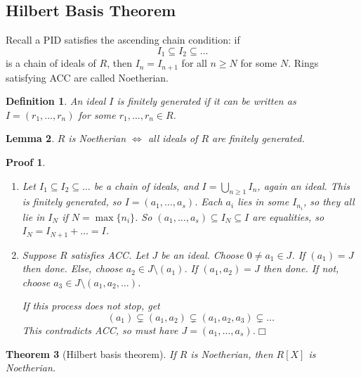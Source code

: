 \documentclass{article}
\theoremstyle{plain}\theoremheaderfont{\normalfont\itshape}\theorembodyfont{\rmfamily}\theoremseparator{.}\newtheorem*{rem}{Remark}\newtheorem*{ex}{Example}\newtheorem*{proof}{Proof}\newtheorem*{altp}{Alternative proof}\newtheorem*{nonex}{Non-Example}
\theoremstyle{plain}\theoremheaderfont{\normalfont\bfseries}\theorembodyfont{\rmfamily}\theoremseparator{.}\newtheorem{thm}{Theorem}[section]\newtheorem{lem}[thm]{Lemma}\newtheorem{prop}[thm]{Proposition}\newtheorem*{cor}{Corollary}\newtheorem{defn}[thm]{Definition}\newtheorem{clm}[thm]{Claim}\newtheorem{clminproof}{Claim}\newtheorem*{notn}{Notation}\newtheorem*{exer}{Exercise}\newtheorem*{lemnn}{Lemma}
\theoremstyle{break}\theoremheaderfont{\normalfont\itshape}\theorembodyfont{\rmfamily}\theoremseparator{.\medskip}\newtheorem*{proofskip}{Proof}\newtheorem*{exs}{Examples}\newtheorem*{rems}{Remarks}\newtheorem*{obs}{Observations}
\theoremstyle{break}\theoremheaderfont{\normalfont\bfseries}\theorembodyfont{\rmfamily}\theoremseparator{.\medskip}\newtheorem{lemskip}[thm]{Lemma}\newtheorem{defnskip}[thm]{Definition}\newtheorem{propskip}[thm]{Proposition}\newtheorem{thmskip}[thm]{Theorem}
\numberwithin{equation}{section}
\newcommand{\qed}{\hfill\ensuremath{\Box}}
\begin{document}
    \subsection{Hilbert Basis Theorem}
    Recall a PID satisfies the ascending chain condition: if
    \[I_1\subseteq I_2\subseteq \dots\]
    is a chain of ideals of \(R\), then \(I_{n}=I_{n+1}\) for all \(n\ge N\) for some \(N\). Rings satisfying ACC are called Noetherian.
    \begin{defn}
        An ideal \(I\) is \textit{finitely generated} if it can be written as \(I=(r_1,\dots,r_n)\) for some \(r_1,\dots,r_n\in R\).
    \end{defn}
    \begin{lem}
        \(R\) is Noetherian \(\iff\) all ideals of \(R\) are finitely generated.
    \end{lem}
    \begin{proofskip}
        \begin{enumerate}[topsep=0pt]
            \item[(\(\Leftarrow\))] Let \(I_1\subseteq I_2\subseteq\dots\) be a chain of ideals, and \(I=\bigcup_{n\ge 1}I_n\), again an ideal. This is finitely generated, so \(I=(a_1,\dots,a_s)\). Each \(a_i\) lies in some \(I_{n_i}\), so they all lie in \(I_N\) if \(N=\max\{n_i\}\). So \((a_1,\dots,a_s)\subseteq I_N\subseteq I\) are equalities, so \(I_{N}=I_{N+1}+\dots=I\).
            \item[(\(\Rightarrow\))] Suppose \(R\) satisfies ACC. Let \(J\) be an ideal. Choose \(0\ne a_1\in J\). If \((a_1)=J\) then done. Else, choose \(a_2\in J\setminus(a_1)\). If \((a_1,a_2)=J\) then done. If not, choose \(a_3\in J\setminus (a_1,a_2,\dots)\).
            
            If this process does not stop, get
            \[(a_1)\subsetneq (a_1,a_2)\subsetneq (a_1,a_2,a_3)\subsetneq\dots\]
            This contradicts ACC, so must have \(J=(a_1,\dots,a_s)\).\qed
        \end{enumerate}
    \end{proofskip}
    \begin{thm}[Hilbert basis theorem]
        If \(R\) is Noetherian, then \(R[X]\) is Noetherian.
    \end{thm}
\end{document}
